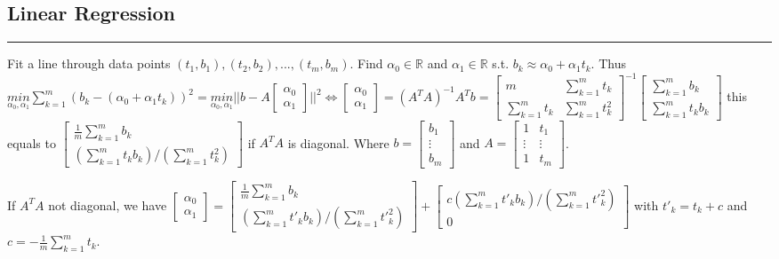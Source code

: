 \documentclass[7pt,landscape, margin = 0.1mm]{article}
\newcommand*{\mysubsection}[1]{\vspace{-2mm}\color{chaptercolor}\subsection{ #1 }
\vspace{-1mm}\hrule\vspace{1.5mm}\color{black}
\vspace{2mm}}
\begin{document}
\begin{multicols}{4}
\begin{flushleft}
{{\mysubsection{Linear Regression}
Fit a line through data points $(t_1,b_1),(t_2,b_2),...,(t_m,b_m)$. Find $\alpha_0\in \mathbb{R}$ and $\alpha_1\in\mathbb{R}$ s.t. $b_k\approx\alpha_0+\alpha_1t_k$. Thus $\underset{\alpha_0,\alpha_1}{min}\sum_{k=1}^m(b_k-(\alpha_0+\alpha_1t_k))^2 = \underset{\alpha_0,\alpha_1}{min}||b-A\begin{bmatrix}
    \alpha_0\\
    \alpha_1
\end{bmatrix}||^2 \Leftrightarrow \begin{bmatrix}
    \alpha_0\\
    \alpha_1
\end{bmatrix} = (A^TA)^{-1}A^Tb = \begin{bmatrix}
    m & \sum_{k=1}^mt_k\\
    \sum_{k=1}^mt_k & \sum_{k=1}^mt_k^2
\end{bmatrix}^{-1}\begin{bmatrix}
    \sum_{k=1}^mb_k\\
    \sum_{k=1}^mt_kb_k
\end{bmatrix}$ this equals to $\begin{bmatrix}
    \frac{1}{m}\sum_{k=1}^mb_k\\
    (\sum_{k=1}^mt_kb_k) / (\sum_{k=1}^mt_k^2)
\end{bmatrix}$ if $A^TA$ is diagonal. Where $b=\begin{bmatrix}
    b_1\\
    \vdots\\
    b_m
\end{bmatrix}$ and $A=\begin{bmatrix}
    1 & t_1\\
    \vdots & \vdots\\
    1 & t_m
\end{bmatrix}$.

If $A^TA$ not diagonal, we have $\begin{bmatrix}
    \alpha_0\\
    \alpha_1
\end{bmatrix} = \begin{bmatrix}
    \frac{1}{m}\sum_{k=1}^mb_k\\
    (\sum_{k=1}^mt'_kb_k) / (\sum_{k=1}^mt'_k^2)
\end{bmatrix} + \begin{bmatrix}
    c(\sum_{k=1}^mt'_kb_k) / (\sum_{k=1}^mt'_k^2)\\
    0
\end{bmatrix}$ with $t'_k = t_k+c$ and $c=-\frac{1}{m}\sum_{k=1}^mt_k$.




}}
\end{flushleft}
\end{multicols}
\end{document}
